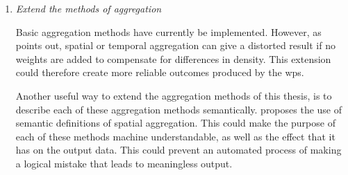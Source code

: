 \begin{enumerate}
	\item \textit{Extend the methods of aggregation}
	\label{par:FRaggregation}
	
	Basic aggregation methods have currently be implemented. However, as \cite{SW:Ganesan} points out, spatial or temporal aggregation can give a distorted result if no weights are added to compensate for differences in density. This extension could therefore create more reliable outcomes produced by the \ac{wps}. 
	
	Another useful way to extend the aggregation methods of this thesis, is to describe each of these aggregation methods semantically. \cite{SSW:Stasch4} proposes the use of semantic definitions of spatial aggregation. This could make the purpose of each of these methods machine understandable, as well as the effect that it has on the output data. This could prevent an automated process of making a logical mistake that leads to meaningless output.
\end{enumerate} 


